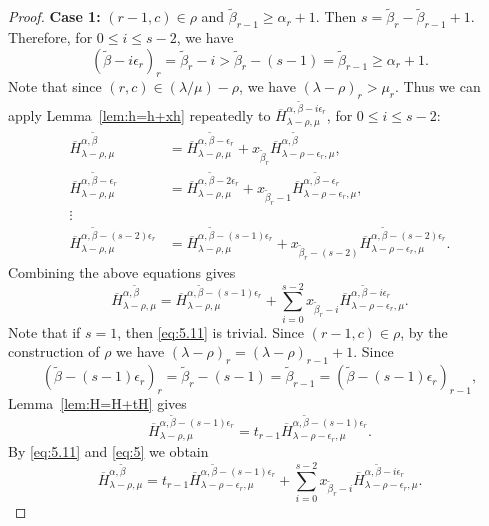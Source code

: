 \documentclass[12pt]{amsart}
\numberwithin{equation}{section}
\theoremstyle{definition}
\newcommand\wb{\widetilde{\beta}}
\newcommand\ovH{\overline{H}}
\newcommand\lm{{\lambda/\mu}}
\begin{document}
\begin{proof}
  \textbf{Case 1:} $(r-1,c)\in\rho$ and $\wb_{r-1}\ge\alpha_r+1$. Then
  $s=\wb_r-\wb_{r-1}+1$. Therefore, for $0\le i\le s-2$, we have
\[
(\wb-i\epsilon_r)_r =\wb_r-i > \wb_r -(s-1) = \wb_{r-1}\ge \alpha_r +1.
\]
Note that since $(r,c)\in (\lm)-\rho$, we have $(\lambda-\rho)_r>\mu_r$.
Thus we can apply Lemma~\ref{lem:h=h+xh} repeatedly to
$\ovH^{\alpha,\wb-i\epsilon_r}_{\lambda-\rho,\mu}$, for $0\le i\le s-2$:
\begin{align*}
  \ovH^{\alpha,\wb}_{\lambda-\rho,\mu} &=
  \ovH^{\alpha,\wb-\epsilon_r}_{\lambda-\rho,\mu}
  + x_{\wb_r}\ovH^{\alpha,\wb}_{\lambda-\rho-\epsilon_r,\mu},\\
  \ovH^{\alpha,\wb-\epsilon_r}_{\lambda-\rho,\mu} &=
  \ovH^{\alpha,\wb-2\epsilon_r}_{\lambda-\rho,\mu}
  + x_{\wb_r-1}\ovH^{\alpha,\wb-\epsilon_r}_{\lambda-\rho-\epsilon_r,\mu},\\
  \vdots \\
  \ovH^{\alpha,\wb-(s-2)\epsilon_r}_{\lambda-\rho,\mu} &=
  \ovH^{\alpha,\wb-(s-1)\epsilon_r}_{\lambda-\rho,\mu}
  + x_{\wb_r-(s-2)}\ovH^{\alpha,\wb-(s-2)\epsilon_r}_{\lambda-\rho-\epsilon_r,\mu}.
\end{align*}
Combining the above equations gives
\begin{equation}\label{eq:5.11}
  \ovH^{\alpha,\wb}_{\lambda-\rho,\mu} =
  \ovH^{\alpha,\wb-(s-1)\epsilon_r}_{\lambda-\rho,\mu}
  +\sum_{i=0}^{s-2} x_{\wb_r-i}
  \ovH^{\alpha,\wb-i\epsilon_r}_{\lambda-\rho-\epsilon_r,\mu}.
\end{equation}
Note that if $s=1$, then \eqref{eq:5.11} is trivial. Since $(r-1,c)\in\rho$, by
the construction of $\rho$ we have $(\lambda-\rho)_r = (\lambda-\rho)_{r-1}+1$.
Since
\[
(\wb-(s-1)\epsilon_r)_r = \wb_r-(s-1)= \wb_{r-1} = (\wb-(s-1)\epsilon_r)_{r-1},
\]
Lemma~\ref{lem:H=H+tH} gives
\begin{equation}
  \label{eq:5}
  \ovH^{\alpha,\wb-(s-1)\epsilon_r}_{\lambda-\rho,\mu}  = t_{r-1}
  \ovH^{\alpha,\wb-(s-1)\epsilon_r}_{\lambda-\rho-\epsilon_r,\mu}.
\end{equation}
By \eqref{eq:5.11} and \eqref{eq:5} we obtain
\begin{equation}
  \label{eq:6}
  \ovH^{\alpha,\wb}_{\lambda-\rho,\mu} = t_{r-1}
  \ovH^{\alpha,\wb-(s-1)\epsilon_r}_{\lambda-\rho-\epsilon_r,\mu}
  +\sum_{i=0}^{s-2} x_{\wb_r-i}
  \ovH^{\alpha,\wb-i\epsilon_r}_{\lambda-\rho-\epsilon_r,\mu}.
\end{equation}


\end{proof}
\end{document}
